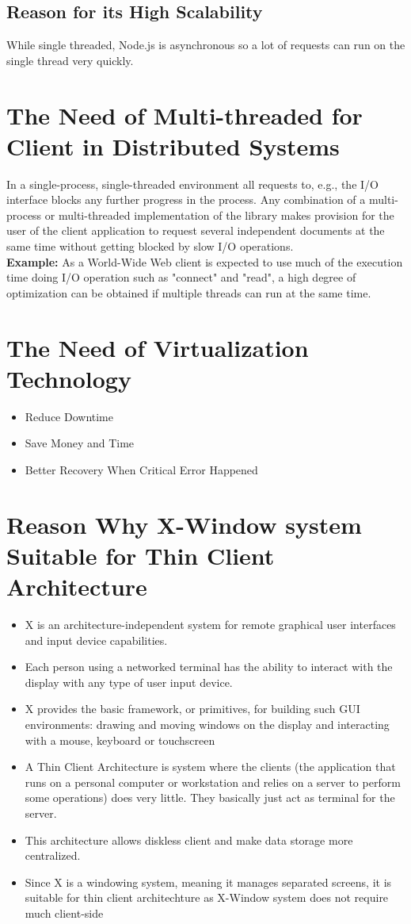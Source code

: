 \documentclass[11pt,a4paper]{article}
\begin{document}
		\subsection{Reason for its High Scalability}
		While single threaded, Node.js is asynchronous so a lot of requests can run on the single thread very quickly.
	\section{The Need of Multi-threaded for Client in Distributed Systems}
	In a single-process, single-threaded environment all requests to, e.g., the I/O interface blocks any further progress in the process. Any combination of a multi-process or multi-threaded implementation of the library makes provision for the user of the client application to request several independent documents at the same time without getting blocked by slow I/O operations.\\
	\textbf{Example:} As a World-Wide Web client is expected to use much of the execution time doing I/O operation such as "connect" and "read", a high degree of optimization can be obtained if multiple threads can run at the same time.
	\section{The Need of Virtualization Technology}
	\begin{itemize}
		\item Reduce Downtime
		\item Save Money and Time
		\item Better Recovery When Critical Error Happened
	\end{itemize}
	\section{Reason Why X-Window system Suitable for Thin Client Architecture}
	\begin{itemize}
		\item X is an architecture-independent system for remote graphical user interfaces and input device capabilities.
		\item Each person using a networked terminal has the ability to interact with the display with any type of user input device.
		\item X provides the basic framework, or primitives, for building such GUI environments: drawing and moving windows on the display and interacting with a mouse, keyboard or touchscreen
		\item A Thin Client Architecture is system where the clients (the application that runs on a personal computer or workstation and relies on a server to perform some operations) does very little. They basically just act as terminal for the server.
		\item This architecture allows diskless client and make data storage more centralized.
		\item Since X is a windowing system, meaning it manages separated screens, it is suitable for thin client architechture as X-Window system does not require much client-side 
	\end{itemize}
\end{document}
